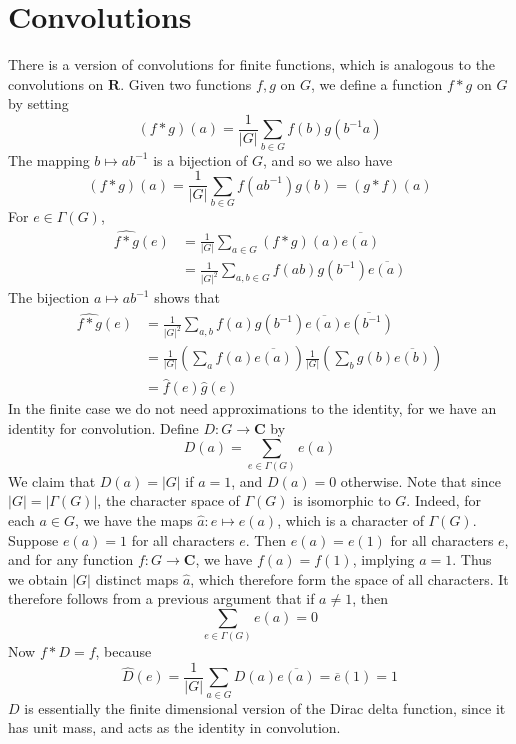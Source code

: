 \section{Convolutions}

There is a version of convolutions for finite functions, which is analogous to the convolutions on $\mathbf{R}$. Given two functions $f,g$ on $G$, we define a function $f * g$ on $G$ by setting
%
\[ (f * g)(a) = \frac{1}{|G|} \sum_{b \in G} f(b) g(b^{-1} a) \]
%
The mapping $b \mapsto ab^{-1}$ is a bijection of $G$, and so we also have
%
\[ (f * g)(a) = \frac{1}{|G|} \sum_{b \in G} f(ab^{-1}) g(b) = (g * f)(a) \]
%
For $e \in \Gamma(G)$,
%
\begin{align*}
    \widehat{f * g}(e) &= \frac{1}{|G|} \sum_{a \in G} (f*g)(a) \overline{e(a)}\\
    &= \frac{1}{|G|^2} \sum_{a,b \in G} f(ab) g(b^{-1}) \overline{e(a)}
\end{align*}
%
The bijection $a \mapsto ab^{-1}$ shows that
%
\begin{align*}
    \widehat{f*g}(e) &= \frac{1}{|G|^2} \sum_{a,b} f(a) g(b^{-1}) \overline{e(a)} \overline{e(b^{-1})}\\
    &= \frac{1}{|G|} \left( \sum_a f(a) \overline{e(a)} \right) \frac{1}{|G|} \left( \sum_b g(b) \overline{e(b)} \right)\\
    &= \widehat{f}(e) \widehat{g}(e)
\end{align*}
%
In the finite case we do not need approximations to the identity, for we have an identity for convolution. Define $D: G \to \mathbf{C}$ by
%
\[ D(a) = \sum_{e \in \Gamma(G)} e(a) \]
%
We claim that $D(a) = |G|$ if $a = 1$, and $D(a) = 0$ otherwise. Note that since $|G| = |\Gamma(G)|$, the character space of $\Gamma(G)$ is isomorphic to $G$. Indeed, for each $a \in G$, we have the maps $\widehat{a}: e \mapsto e(a)$, which is a character of $\Gamma(G)$. Suppose $e(a) = 1$ for all characters $e$. Then $e(a) = e(1)$ for all characters $e$, and for any function $f: G \to \mathbf{C}$, we have $f(a) = f(1)$, implying $a = 1$. Thus we obtain $|G|$ distinct maps $\widehat{a}$, which therefore form the space of all characters. It therefore follows from a previous argument that if $a \neq 1$, then
%
\[ \sum_{e \in \Gamma(G)} e(a) = 0 \]
%
Now $f * D = f$, because
%
\[ \widehat{D}(e) = \frac{1}{|G|} \sum_{a \in G} D(a) \overline{e(a)} = \overline{e}(1) = 1 \]
%
$D$ is essentially the finite dimensional version of the Dirac delta function, since it has unit mass, and acts as the identity in convolution.

